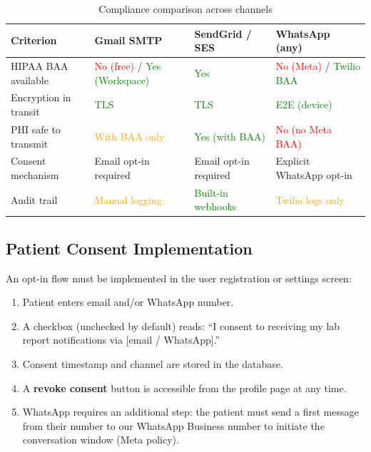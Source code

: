 \documentclass[12pt,a4paper]{article}
\begin{document}
\begin{table}[h!]
\centering
{}
\begin{tabularx}{\linewidth}{l >{\centering\arraybackslash}X >{\centering\arraybackslash}X >{\centering\arraybackslash}X}
\toprule
\textbf{Criterion} &
    \textbf{Gmail SMTP} &
    \textbf{SendGrid / SES} &
    \textbf{WhatsApp (any)} \\
\midrule
HIPAA BAA available &
    \textcolor{red}{No (free)} / \textcolor{green}{Yes (Workspace)} &
    \textcolor{green}{Yes} &
    \textcolor{red}{No (Meta)} / \textcolor{green}{Twilio BAA} \\
Encryption in transit &
    \textcolor{green}{TLS} &
    \textcolor{green}{TLS} &
    \textcolor{green}{E2E (device)} \\
PHI safe to transmit &
    \textcolor{orange}{With BAA only} &
    \textcolor{green}{Yes (with BAA)} &
    \textcolor{red}{No (no Meta BAA)} \\
Consent mechanism &
    Email opt-in required &
    Email opt-in required &
    Explicit WhatsApp opt-in \\
Audit trail &
    \textcolor{orange}{Manual logging} &
    \textcolor{green}{Built-in webhooks} &
    \textcolor{orange}{Twilio logs only} \\
\bottomrule
\end{tabularx}
\caption{Compliance comparison across channels}
\end{table}

\subsection{Patient Consent Implementation}

An opt-in flow must be implemented in the user registration or settings
screen:

\begin{enumerate}[leftmargin=2em, itemsep=2pt]
    \item Patient enters email and/or WhatsApp number.
    \item A checkbox (unchecked by default) reads: ``I consent to receiving
          my lab report notifications via [email / WhatsApp].''
    \item Consent timestamp and channel are stored in the database.
    \item A \textbf{revoke consent} button is accessible from the profile
          page at any time.
    \item WhatsApp requires an additional step: the patient must send a
          first message from their number to our WhatsApp Business number
          to initiate the conversation window (Meta policy).
\end{enumerate}
\end{document}
